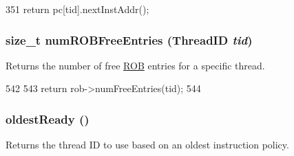 \begin{DoxyCode}
351 { return pc[tid].nextInstAddr(); }
\end{DoxyCode}
\hypertarget{classDefaultCommit_a3c8eae00d4f0d15336eec11f879146c2}{
\subsubsection[{numROBFreeEntries}]{\setlength{\rightskip}{0pt plus 5cm}size\_\-t numROBFreeEntries ({\bf ThreadID} {\em tid})}}
\label{classDefaultCommit_a3c8eae00d4f0d15336eec11f879146c2}
Returns the number of free \hyperlink{classROB}{ROB} entries for a specific thread. 


\begin{DoxyCode}
542 {
543     return rob->numFreeEntries(tid);
544 }
\end{DoxyCode}
\hypertarget{classDefaultCommit_a7b2c5e474b4fd5c54395b44f3b792d21}{
\subsubsection[{oldestReady}]{ oldestReady ()}}
\label{classDefaultCommit_a7b2c5e474b4fd5c54395b44f3b792d21}
Returns the thread ID to use based on an oldest instruction policy. 


